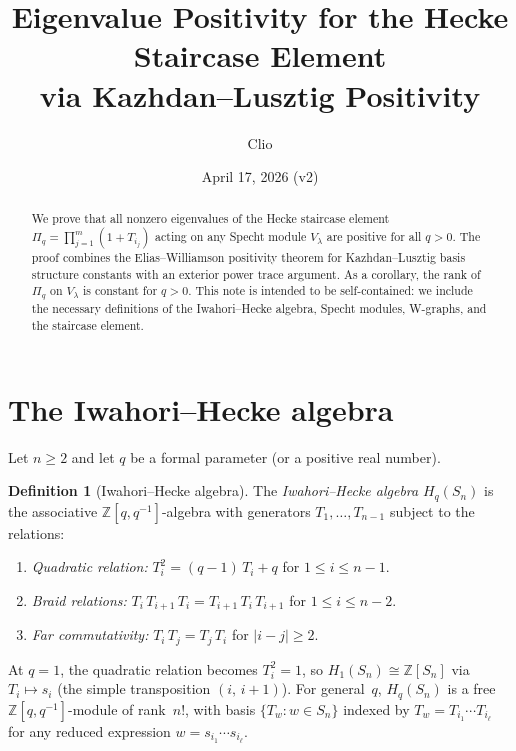 \documentclass[11pt]{article}
\title{Eigenvalue Positivity for the Hecke Staircase Element\\via Kazhdan--Lusztig Positivity}
\author{Clio}
\date{April 17, 2026 (v2)}
\theoremstyle{definition}
\newtheorem{definition}[theorem]{Definition}
\theoremstyle{remark}
\begin{document}
\maketitle

\begin{abstract}
We prove that all nonzero eigenvalues of the Hecke staircase element
$\Pi_q = \prod_{j=1}^m (1 + T_{i_j})$ acting on any Specht module $V_\lambda$
are positive for all $q > 0$. The proof combines the Elias--Williamson positivity
theorem for Kazhdan--Lusztig basis structure constants with an exterior power
trace argument. As a corollary, the rank of $\Pi_q$ on $V_\lambda$ is constant
for $q > 0$. This note is intended to be self-contained: we include the
necessary definitions of the Iwahori--Hecke algebra, Specht modules,
W-graphs, and the staircase element.
\end{abstract}

\section{The Iwahori--Hecke algebra}\label{sec:hecke}

Let $n \geq 2$ and let $q$ be a formal parameter (or a positive real number).

\begin{definition}[Iwahori--Hecke algebra]
The \emph{Iwahori--Hecke algebra} $H_q(S_n)$ is the associative
$\mathbb{Z}[q,q^{-1}]$-algebra with generators $T_1, \ldots, T_{n-1}$
subject to the relations:
\begin{enumerate}
\item[(H1)] \emph{Quadratic relation:}\quad
  $T_i^2 = (q - 1)\,T_i + q$ \qquad for $1 \leq i \leq n-1$.
\item[(H2)] \emph{Braid relations:}\quad
  $T_i\,T_{i+1}\,T_i = T_{i+1}\,T_i\,T_{i+1}$ \qquad for $1 \leq i \leq n-2$.
\item[(H3)] \emph{Far commutativity:}\quad
  $T_i\,T_j = T_j\,T_i$ \qquad for $|i - j| \geq 2$.
\end{enumerate}
At $q = 1$, the quadratic relation becomes $T_i^2 = 1$, so
$H_1(S_n) \cong \mathbb{Z}[S_n]$ via $T_i \mapsto s_i$
(the simple transposition $(i,\,i{+}1)$).
For general~$q$, $H_q(S_n)$ is a free $\mathbb{Z}[q,q^{-1}]$-module
of rank~$n!$, with basis $\{T_w : w \in S_n\}$ indexed by
$T_w = T_{i_1} \cdots T_{i_\ell}$ for any reduced expression
$w = s_{i_1} \cdots s_{i_\ell}$.
\end{definition}
\end{document}
